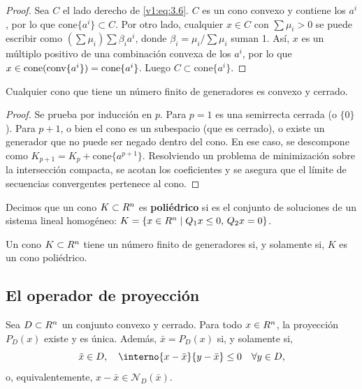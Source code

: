 \begin{proof}
 Sea $C$ el lado derecho de \eqref{v1:eq:3.6}. $C$ es un cono convexo y contiene los $a^i$, por lo que $\text{cone}\{a^i\} \subset C$. Por otro lado, cualquier $x \in C$ con $\sum \mu_i > 0$ se puede escribir como $(\sum \mu_i) \sum \beta_i a^i$, donde $\beta_i = \mu_i / \sum \mu_i$ suman 1. Así, $x$ es un múltiplo positivo de una combinación convexa de los $a^i$, por lo que $x \in \text{cone}(\operatorname{conv}\{a^i\}) = \text{cone}\{a^i\}$. Luego $C \subset \text{cone}\{a^i\}$.
\end{proof}

\begin{lemma}\label{v1:lem:3.2.1}
 Cualquier cono que tiene un número finito de generadores es convexo y cerrado.
\end{lemma}

\begin{proof}
 Se prueba por inducción en $p$. Para $p=1$ es una semirrecta cerrada (o $\{0\}$). Para $p+1$, o bien el cono es un subespacio (que es cerrado), o existe un generador que no puede ser negado dentro del cono. En ese caso, se descompone como $K_{p+1} = K_p + \text{cone}\{a^{p+1}\}$. Resolviendo un problema de minimización sobre la intersección compacta, se acotan los coeficientes y se asegura que el límite de secuencias convergentes pertenece al cono.
\end{proof}

\begin{definition}\label{v1:def:3.2.5}
 Decimos que un cono $K \subset R^n$ es \textbf{poliédrico} si es el conjunto de soluciones de un sistema lineal homogéneo: $K = \{ x \in R^n \mid Q_1 x \leq 0, \, Q_2 x = 0 \}$.
\end{definition}

\begin{theorem}\label{v1:thm:3.2.3}
 Un cono $K \subset R^n$ tiene un número finito de generadores si, y solamente si, $K$ es un cono poliédrico.
\end{theorem}

\subsection{El operador de proyección}

\begin{theorem}\label{v1:thm:3.2.4}
 Sea $D \subset R^n$ un conjunto convexo y cerrado. Para todo $x \in R^n$, la proyección $P_D(x)$ existe y es única. Además, $\bar{x} = P_D(x)$ si, y solamente si,
 \begin{equation}
 \bar{x} \in D, \quad \interno{x - \bar{x}}{y - \bar{x}} \leq 0 \quad \forall y \in D, \label{v1:eq:3.7}
 \end{equation}
 o, equivalentemente, $x - \bar{x} \in \mathcal{N}_D(\bar{x})$.
\end{theorem}

